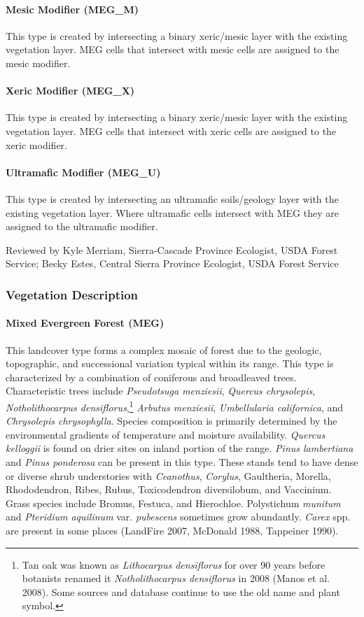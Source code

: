 \paragraph{Mesic Modifier (MEG\_M)}
This type is created by intersecting a binary xeric/mesic layer with the existing vegetation layer. MEG cells that intersect with mesic cells are assigned to the mesic modifier.
\paragraph{Xeric Modifier (MEG\_X)}
This type is created by intersecting a binary xeric/mesic layer with the existing vegetation layer. MEG cells that intersect with xeric cells are assigned to the xeric modifier.
\paragraph{Ultramafic Modifier (MEG\_U)}
This type is created by intersecting an ultramafic soils/geology layer with the existing vegetation layer. Where ultramafic cells intersect with MEG they are assigned to the ultramafic modifier.



\noindent Reviewed by Kyle Merriam, Sierra-Cascade Province Ecologist, USDA Forest Service; Becky Estes, Central Sierra Province Ecologist, USDA Forest Service


\subsubsection{Vegetation Description}
\paragraph{Mixed Evergreen Forest (MEG)} 	This landcover type forms a complex mosaic of forest due to the geologic, topographic, and successional variation typical within its range. This type is characterized by a combination of coniferous and broadleaved trees. Characteristic trees include \emph{Pseudotsuga menziesii}, \emph{Quercus chrysolepis}, \emph{Notholithocarpus densiflorus},\footnote{Tan oak was known as \emph{Lithocarpus densiflorus} for over 90 years before botanists renamed it \emph{Notholithocarpus densiflorus} in 2008 (Manos et al. 2008). Some sources and database continue to use the old name and plant symbol.}  \emph{Arbutus menziesii}, \emph{Umbellularia californica}, and \emph{Chrysolepis chrysophylla}. Species composition is primarily determined by the environmental gradients of temperature and moisture availability. \emph{Quercus kelloggii} is found on drier sites on inland portion of the range. \emph{Pinus lambertiana} and \emph{Pinus ponderosa} can be present in this type. These stands tend to have dense or diverse shrub understories with \emph{Ceanothus}, \emph{Corylus}, Gaultheria, Morella, Rhododendron, Ribes, Rubus, Toxicodendron diversilobum, and Vaccinium. Grass species include Bromus, Festuca, and Hierochloe. Polystichum \emph{munitum} and \emph{Pteridium aquilinum} var. \emph{pubescens} sometimes grow abundantly. \emph{Carex} spp. are present in some places (LandFire 2007, McDonald 1988, Tappeiner 1990).

